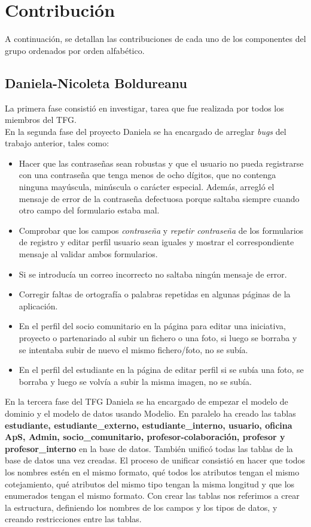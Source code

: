 \documentclass[11pt]{book}
\begin{document}
\chapter{Contribución}
A continuación, se detallan las contribuciones de cada uno de los componentes del grupo ordenados por orden alfabético.
\section{Daniela-Nicoleta Boldureanu}
La primera fase consistió en investigar, tarea que fue realizada por todos los miembros del TFG.\\
En la segunda fase del proyecto Daniela se ha encargado de arreglar \textit{bugs} del trabajo anterior, tales como:
\begin{itemize} 
	\item Hacer que las contraseñas sean robustas y que el usuario no pueda registrarse con una contraseña que tenga menos de ocho dígitos, que no contenga ninguna mayúscula, minúscula o carácter especial. Además, arregló el mensaje de error de la contraseña defectuosa porque saltaba siempre cuando otro campo del formulario estaba mal.
	\item Comprobar que los campos \emph{contraseña} y \emph{repetir contraseña} de los formularios de registro y editar perfil usuario sean iguales y mostrar el correspondiente mensaje al validar ambos formularios.
	\item Si se introducía un correo incorrecto no saltaba ningún mensaje de error.
	\item Corregir faltas de ortografía o palabras repetidas en algunas páginas de la aplicación.
	\item En el perfil del socio comunitario en la página para editar una iniciativa, proyecto o partenariado al subir un fichero o una foto, si luego se borraba y se intentaba subir de nuevo el mismo fichero/foto, no se subía.
	\item En el perfil del estudiante en la página de editar perfil si se subía una foto, se borraba y luego se volvía a subir la misma imagen, no se subía.
\end{itemize}
En la tercera fase del TFG Daniela se ha encargado de empezar el modelo de dominio y el modelo de datos usando Modelio. En paralelo ha creado las tablas \textbf{estudiante, estudiante\_externo, estudiante\_interno, usuario, oficina ApS, Admin, socio\_comunitario, profesor-colaboración, profesor y profesor\_interno} en la base de datos. También unificó todas las tablas de la base de datos una vez creadas. El proceso de unificar consistió en hacer que todos los nombres estén en el mismo formato, qué todos los atributos tengan el mismo cotejamiento, qué atributos del mismo tipo tengan la misma longitud y que los enumerados tengan el mismo formato. Con crear las tablas nos referimos a crear la estructura, definiendo los nombres de los campos y los tipos de datos, y creando restricciones entre las tablas.\\\\
\end{document}
